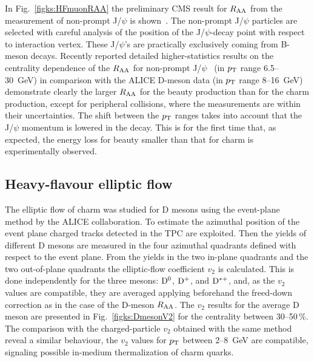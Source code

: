 In Fig.~\ref{figks:HFmuonRAA} the preliminary CMS result for $R_{\rm AA}$ from the measurement of non-prompt J/$\psi$ is shown~\cite{Chatrchyan:2012np}. The non-prompt J/$\psi$ particles are selected with careful analysis of the position of the J/$\psi$-decay point with respect to interaction vertex. These J/$\psi$'s are practically exclusively coming from B-meson decays. Recently reported detailed higher-statistics results on the centrality dependence of the $R_{\rm AA}$ for non-prompt J/$\psi$~\cite{CMS:2012wba} (in $p_{\rm T}$ range 6.5--30~GeV)  in comparison with the ALICE D-meson data (in $p_{\rm T}$ range 8--16~GeV) demonstrate clearly the larger $R_{\rm AA}$ for the beauty production than for the charm production, except for peripheral collisions, where the measurements are within their uncertainties. The shift between the $p_{\rm T}$ ranges takes into account that the J/$\psi$ momentum is lowered in the decay. This is for the first time that, as expected, the energy loss for beauty smaller than that for charm is experimentally observed.
\subsection{Heavy-flavour elliptic flow}
\label{subsecks:heavyflow}
The elliptic flow of charm was studied for D mesons using the event-plane method by the ALICE collaboration. To estimate the azimuthal position of the event plane charged tracks detected in the TPC are exploited. Then the yields of different D mesons are measured in the four azimuthal quadrants defined with respect to the event plane. From the yields in the two in-plane quadrants and the two out-of-plane quadrants the elliptic-flow coefficient $v_2$ is calculated. This is done independently for the three mesons: ${\rm D}^0$, ${\rm D}^+$, and ${\rm D}^{*+}$, and, as the $v_2$ values are compatible, they are averaged applying beforehand the freed-down correction as in the case of the D-meson $R_{\rm AA}$. The $v_2$ results for the average D meson are presented in Fig.~\ref{figks:DmesonV2} for the centrality between 30--50\,\%. The comparison with the charged-particle $v_2$ obtained with the same method reveal a similar behaviour, the $v_2$ values for $p_{\rm T}$ between 2--8~GeV are compatible, signaling possible in-medium thermalization of charm quarks.

